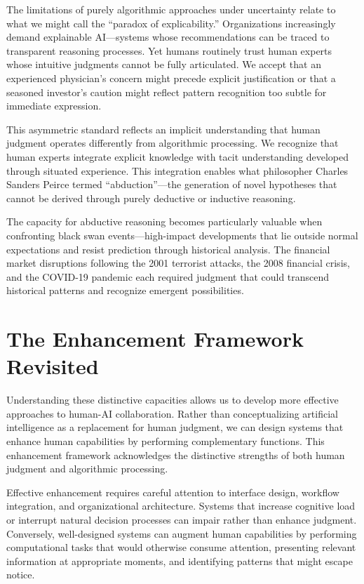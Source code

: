 \documentclass[
  Letterpaper,
]{scrbook}
\begin{document}
The limitations of purely algorithmic approaches under uncertainty
relate to what we might call the ``paradox of explicability.''
Organizations increasingly demand explainable AI---systems whose
recommendations can be traced to transparent reasoning processes. Yet
humans routinely trust human experts whose intuitive judgments cannot be
fully articulated. We accept that an experienced physician's concern
might precede explicit justification or that a seasoned investor's
caution might reflect pattern recognition too subtle for immediate
expression.

This asymmetric standard reflects an implicit understanding that human
judgment operates differently from algorithmic processing. We recognize
that human experts integrate explicit knowledge with tacit understanding
developed through situated experience. This integration enables what
philosopher Charles Sanders Peirce termed ``abduction''---the generation
of novel hypotheses that cannot be derived through purely deductive or
inductive reasoning.

The capacity for abductive reasoning becomes particularly valuable when
confronting black swan events---high-impact developments that lie
outside normal expectations and resist prediction through historical
analysis. The financial market disruptions following the 2001 terrorist
attacks, the 2008 financial crisis, and the COVID-19 pandemic each
required judgment that could transcend historical patterns and recognize
emergent possibilities.

\section{The Enhancement Framework
Revisited}\label{the-enhancement-framework-revisited}

Understanding these distinctive capacities allows us to develop more
effective approaches to human-AI collaboration. Rather than
conceptualizing artificial intelligence as a replacement for human
judgment, we can design systems that enhance human capabilities by
performing complementary functions. This enhancement framework
acknowledges the distinctive strengths of both human judgment and
algorithmic processing.

Effective enhancement requires careful attention to interface design,
workflow integration, and organizational architecture. Systems that
increase cognitive load or interrupt natural decision processes can
impair rather than enhance judgment. Conversely, well-designed systems
can augment human capabilities by performing computational tasks that
would otherwise consume attention, presenting relevant information at
appropriate moments, and identifying patterns that might escape notice.
\end{document}
